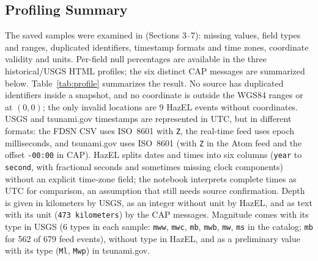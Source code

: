 \documentclass[a4paper,11pt,oneside]{book}
\begin{document}
\subsection{Profiling Summary}
The saved samples were examined in  (Sections 3--7): missing values, field types and ranges, duplicated identifiers, timestamp formats and time zones, coordinate validity and units. Per-field null percentages are available in the three historical/USGS HTML profiles; the six distinct CAP messages are summarized below.
Table~\ref{tab:profile} summarizes the result.
No source has duplicated identifiers inside a snapshot, and no coordinate is outside the WGS84 ranges or at $(0, 0)$; the only invalid locations are 9 HazEL events without coordinates.
USGS and tsunami.gov timestamps are represented in UTC, but in different formats: the FDSN CSV uses ISO~8601 with \texttt{Z}, the real-time feed uses epoch milliseconds, and tsunami.gov uses ISO~8601 (with \texttt{Z} in the Atom feed and the offset \texttt{-00:00} in CAP). HazEL splits dates and times into six columns (\texttt{year} to \texttt{second}, with fractional seconds and sometimes missing clock components) without an explicit time-zone field; the notebook interprets complete times as UTC for comparison, an assumption that still needs source confirmation.
Depth is given in kilometers by USGS, as an integer without unit by HazEL, and as text with its unit (\texttt{473 kilometers}) by the CAP messages.
Magnitude comes with its type in USGS (6 types in each sample: \texttt{mww}, \texttt{mwc}, \texttt{mb}, \texttt{mwb}, \texttt{mw}, \texttt{ms} in the catalog; \texttt{mb} for 562 of 679 feed events), without type in HazEL, and as a preliminary value with its type (\texttt{Ml}, \texttt{Mwp}) in tsunami.gov.
\end{document}

